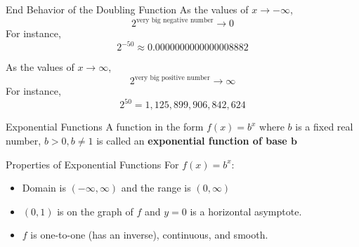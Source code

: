 \documentclass[t,usenames,dvipsnames]{beamer}
\begin{document}
\begin{frame}{End Behavior of the Doubling Function}
As the values of $x \to -\infty$, 
\[ 2^{\text{very big negative number}} \to 0 \] \pause
For instance,
\[ 2^{-50} \approx 0.0000000000000008882 \] \pause
\bigskip

As the values of $x \to \infty$,
\[ 2^{\text{very big positive number}} \to \infty \]    \pause
For instance,
\[ 2^{50} = 1,125,899,906,842,624\]
\end{frame}

\begin{frame}{Exponential Functions}
A function in the form $f(x) = b^x$ where $b$ is a fixed real number, $b > 0, b \neq 1$ is called an \textbf{exponential function of base $\bm{b}$}  \newline\\  \pause
\begin{minipage}{0.45\textwidth}
\end{minipage}
\hspace{0.5cm}
\begin{minipage}{0.45\textwidth}
\end{minipage}
\end{frame}

\begin{frame}{Properties of Exponential Functions}
For $f(x) = b^x$:   \newline\\
\begin{itemize}
    \item Domain is $(-\infty, \infty)$ and the range is $(0,\infty)$ \newline\\ \pause
    \item $(0,1)$ is on the graph of $f$ and $y=0$ is a horizontal asymptote. \newline\\ \pause
    \item $f$ is one-to-one (has an inverse), continuous, and smooth.
\end{itemize}
\end{frame}
\end{document}
